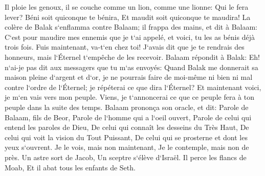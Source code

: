 \verse Il ploie les genoux, il se couche comme un lion, comme une lionne: Qui le fera lever? Béni soit quiconque te bénira, Et maudit soit quiconque te maudira! 
\verse La colère de Balak s`enflamma contre Balaam; il frappa des mains, et dit à Balaam: C`est pour maudire mes ennemis que je t`ai appelé, et voici, tu les as bénis déjà trois fois. 
\verse Fuis maintenant, va-t`en chez toi! J`avais dit que je te rendrais des honneurs, mais l`Éternel t`empêche de les recevoir. 
\verse Balaam répondit à Balak: Eh! n`ai-je pas dit aux messagers que tu m`as envoyés: 
\verse Quand Balak me donnerait sa maison pleine d`argent et d`or, je ne pourrais faire de moi-même ni bien ni mal contre l`ordre de l`Éternel; je répéterai ce que dira l`Éternel? 
\verse Et maintenant voici, je m`en vais vers mon peuple. Viens, je t`annoncerai ce que ce peuple fera à ton peuple dans la suite des temps. 
\verse Balaam prononça son oracle, et dit: Parole de Balaam, fils de Beor, Parole de l`homme qui a l`oeil ouvert, 
\verse Parole de celui qui entend les paroles de Dieu, De celui qui connaît les desseins du Très Haut, De celui qui voit la vision du Tout Puissant, De celui qui se prosterne et dont les yeux s`ouvrent. 
\verse Je le vois, mais non maintenant, Je le contemple, mais non de près. Un astre sort de Jacob, Un sceptre s`élève d`Israël. Il perce les flancs de Moab, Et il abat tous les enfants de Seth. 
